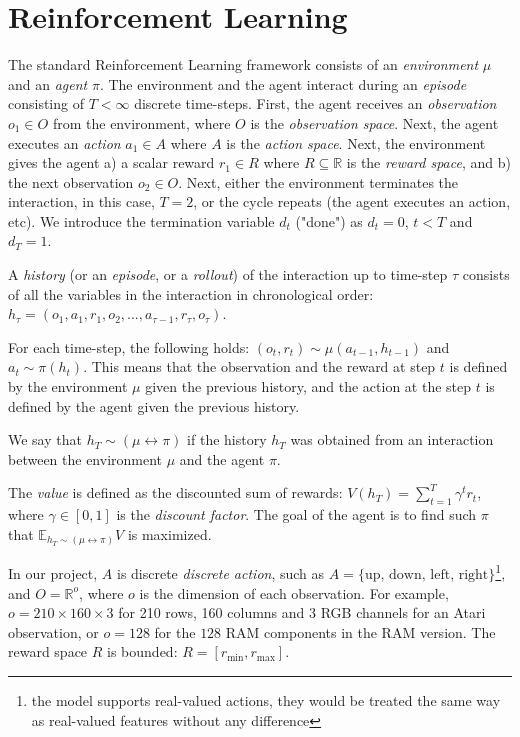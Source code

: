 \documentclass[a4paper,11pt,oneside]{report}
\begin{document}
\section{Reinforcement Learning}
\label{sec:rl}
The standard Reinforcement Learning framework consists of an {\em environment} $\mu$ and an {\em agent} $\pi$. The environment and the agent interact during an {\em episode} consisting of $T<\infty$ discrete time-steps. First, the agent receives an {\em observation} $o_1\in O$ from the environment, where $O$ is the {\em observation space}. Next, the agent executes an {\em action} $a_1\in A$ where $A$ is the {\em action space}. Next, the environment gives the agent a) a scalar reward $r_1\in R$ where $R\subseteq \mathbb R$ is the {\em reward space}, and b) the next observation $o_2\in O$. Next, either the environment terminates the interaction, in this case, $T=2$, or the cycle repeats (the agent executes an action, etc). We introduce the termination variable $d_t$ ("done") as $d_t=0$, $t<T$ and $d_T=1$.

A {\em history} (or an {\em episode}, or a {\em rollout}) of the interaction up to time-step $\tau$ consists of all the variables in the interaction in chronological order: $h_{\tau}=(o_1, a_1, r_1, o_2, ..., a_{\tau-1}, r_{\tau}, o_{\tau})$.

For each time-step, the following holds: $(o_t, r_t)\sim \mu(a_{t-1}, h_{t-1})$ and $a_t\sim \pi(h_{t})$. This means that the observation and the reward at step $t$ is defined by the environment $\mu$ given the previous history, and the action at the step $t$ is defined by the agent given the previous history.

We say that $h_T\sim (\mu\leftrightarrow\pi)$ if the history $h_T$ was obtained from an interaction between the environment $\mu$ and the agent $\pi$.

The {\em value} is defined as the discounted sum of rewards: $V(h_T)=\sum\limits_{t=1}^T\gamma^t r_t$, where $\gamma\in[0, 1]$ is the {\em discount factor}. The goal of the agent is to find such $\pi$ that $\mathbb E_{h_T\sim (\mu\leftrightarrow \pi)} V$ is maximized.

In our project, $A$ is discrete {\em discrete action}, such as $A=\{\mbox{up},\,\mbox{down},\,\mbox{left},\,\mbox{right}\}$\footnote{the model supports real-valued actions, they would be treated the same way as real-valued features without any difference}, and $O=\mathbb R^o$, where $o$ is the dimension of each observation. For example, $o=210\times 160\times 3$ for 210 rows, 160 columns and 3 RGB channels for an Atari observation, or $o=128$ for the $128$ RAM components in the RAM version. The reward space $R$ is bounded: $R=[r_{\min}, r_{\max}]$.
\end{document}
